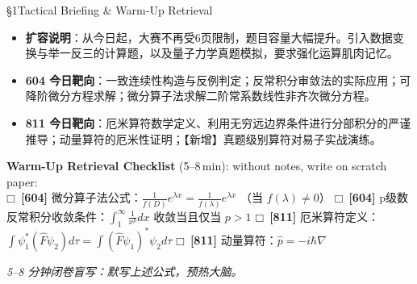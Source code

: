 \documentclass[a4paper,11pt]{article}
\newcommand{\checkbox}{\ensuremath{\mdlgwhtsquare}}
\newcommand{\alerttag}[1]{\textcolor{wine}{\sffamily\bfseries [#1]}}
\begin{document}
\begin{briefing}{\S 1\quad Tactical Briefing \& Warm-Up Retrieval}
\begin{itemize}[leftmargin=1.5em, itemsep=2pt, topsep=1pt]
  \item \textbf{扩容说明}：从今日起，大赛不再受6页限制，题目容量大幅提升。引入数据变换与举一反三的计算题，以及量子力学真题模拟，要求强化运算肌肉记忆。
  \item \textbf{604 今日靶向}：一致连续性构造与反例判定；反常积分审敛法的实际应用；可降阶微分方程求解；微分算子法求解二阶常系数线性非齐次微分方程。
  \item \textbf{811 今日靶向}：厄米算符数学定义、利用无穷远边界条件进行分部积分的严谨推导；动量算符的厄米性证明；【新增】真题级别算符对易子实战演练。
\end{itemize}

\vspace{1mm}
\textbf{Warm-Up Retrieval Checklist} (5--8\,min): without notes, write on scratch paper:\\
\checkbox\ \alerttag{604} 微分算子法公式：$\frac{1}{f(D)} e^{\lambda x} = \frac{1}{f(\lambda)} e^{\lambda x}$ （当 $f(\lambda) \neq 0$）\quad
\checkbox\ \alerttag{604} p级数反常积分收敛条件：$\int_1^{\infty} \frac{1}{x^p} dx$ 收敛当且仅当 $p > 1$ \quad
\checkbox\ \alerttag{811} 厄米算符定义：$\int \psi_1^* (\hat{F}\psi_2) d\tau = \int (\hat{F}\psi_1)^* \psi_2 d\tau$ \quad
\checkbox\ \alerttag{811} 动量算符：$\hat{p} = -i\hbar \nabla$
\end{briefing}

\vspace{4pt}

\begin{tcolorbox}[
  enhanced, colback=white, colframe=border, boxrule=0.6pt, arc=2mm,
  left=4mm, right=4mm, top=3mm, bottom=3mm,
  fonttitle=\sffamily\bfseries\color{slate},
  title={\raisebox{0pt}{\color{royal}\rule{3pt}{10pt}}\hspace{4pt}Warm-Up Retrieval Workspace \textbar\ 白纸破冰与间隔提取草稿区},
  colbacktitle=paper, coltitle=slate,
  titlerule=0pt, toptitle=2mm, bottomtitle=2mm
]
\textcolor{mist}{\footnotesize\itshape 5--8 分钟闭卷盲写：默写上述公式，预热大脑。}
\vspace{8.0cm}
\end{tcolorbox}

\clearpage
\end{document}
